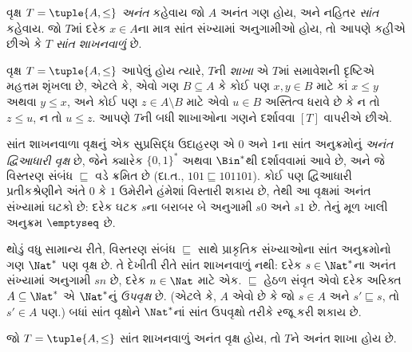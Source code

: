 \begin{defn}
વૃક્ષ $T = \tuple{A, \le}$ \emph{અનંત} કહેવાય જો $A$
અનંત ગણ હોય, અને નહિતર \emph{સાંત} કહેવાય.
જો $T$માં દરેક $x \in A$ના માત્ર સાંત સંખ્યામાં અનુગામીઓ હોય,
તો આપણે કહીએ છીએ કે $T$ \emph{સાંત શાખનવાળું} છે.
\end{defn}

\begin{defn}[શાખાઓ]
વૃક્ષ $T = \tuple{A, \le}$ આપેલું હોય ત્યારે,
$T$ની \emph{શાખા} એ $T$માં સમાવેશની દૃષ્ટિએ મહત્તમ શૃંખલા છે,
એટલે કે, એવો ગણ $B \subseteq A$ કે કોઈ પણ
$x, y \in B$ માટે કાં $x \le y$ અથવા $y \le x$,
અને કોઈ પણ $z \in A \setminus B$ માટે એવો
$u \in B$ અસ્તિત્વ ધરાવે છે કે ન તો $z \le u$, ન તો $u \le z$.
આપણે $T$ની બધી શાખાઓના ગણને દર્શાવવા $[T]$ વાપરીએ છીએ.
\end{defn}

\begin{ex}
સાંત શાખનવાળા વૃક્ષનું એક સુપ્રસિદ્ધ ઉદાહરણ એ $0$ અને $1$ના
સાંત અનુક્રમોનું \emph{અનંત દ્વિઆધારી વૃક્ષ} છે,
જેને ક્યારેક $\{0,1\}^*$ અથવા $\Bin^*$થી દર્શાવવામાં આવે છે,
અને જે વિસ્તરણ સંબંધ $\sqsubseteq$ વડે ક્રમિત છે
(દા.ત., $101 \sqsubseteq 101101$).
કોઈ પણ દ્વિઆધારી પ્રતીકશ્રેણીને અંતે $0$ કે $1$ ઉમેરીને
હંમેશાં વિસ્તારી શકાય છે, તેથી આ વૃક્ષમાં અનંત સંખ્યામાં
ઘટકો છે: દરેક ઘટક $s$ના બરાબર બે અનુગામી $s0$ અને $s1$ છે.
તેનું મૂળ ખાલી અનુક્રમ $\emptyseq$ છે.
\end{ex}

\begin{ex}
થોડું વધુ સામાન્ય રીતે, વિસ્તરણ સંબંધ $\sqsubseteq$ સાથે
પ્રાકૃતિક સંખ્યાઓના સાંત અનુક્રમોનો ગણ $\Nat^*$ પણ વૃક્ષ છે.
તે દેખીતી રીતે સાંત શાખનવાળું નથી: દરેક $s \in \Nat^*$ના
અનંત સંખ્યામાં અનુગામી $sn$ છે, દરેક $n \in \Nat$ માટે એક.
$\sqsubseteq$ હેઠળ સંવૃત એવો દરેક અરિક્ત $A \subseteq \Nat^*$
એ $\Nat^*$નું \emph{ઉપવૃક્ષ} છે.
(એટલે કે, $A$ એવો છે કે જો $s \in A$ અને
$s' \sqsubseteq s$, તો $s' \in A$ પણ.)
બધાં સાંત વૃક્ષોને $\Nat^*$નાં સાંત ઉપવૃક્ષો તરીકે રજૂ કરી શકાય છે.
\end{ex}

\begin{prop}[કેનિગનું સહાયક પ્રમેય]
જો $T = \tuple{A,\le}$ સાંત શાખનવાળું અનંત વૃક્ષ હોય,
તો $T$ને અનંત શાખા હોય છે.
\end{prop}

